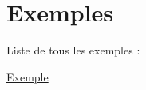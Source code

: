\section{Exemples}
Liste de tous les exemples \+:\begin{DoxyCompactItemize}
\item 
\hyperlink{_exemple-example}{Exemple}
\end{DoxyCompactItemize}
